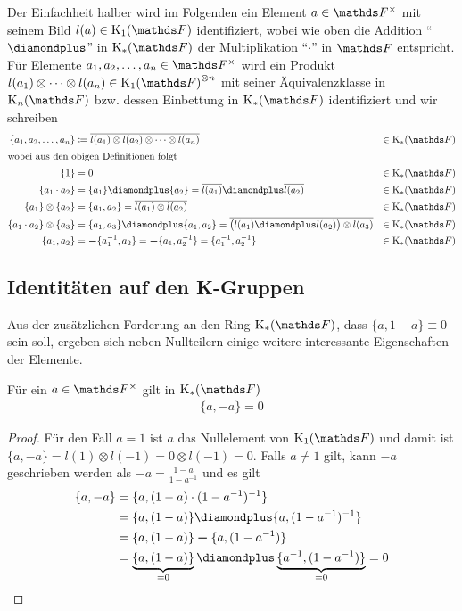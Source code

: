 \documentclass[ngerman,fontsize=11pt, paper=a4, parskip=half, titlepage=true, toc=bib]{scrartcl}
\begin{document}
\begin{Not}
  Der Einfachheit halber wird im Folgenden
  ein Element $a\in\Fx$ mit seinem Bild
  $l(a)\in\K_1(\F)$ identifiziert, wobei wie oben 
  die Addition \enquote{$\p$} in $\KF$
  der Multiplikation \enquote{$\cdot$} in $\F$ entspricht.
  Für Elemente $a_1,a_2,\dotsc,a_n\in\Fx$ wird
  ein Produkt $l(a_1)\otimes\dotsb \otimes l(a_n)\in{\KoF}^{\otimes n}$ 
  mit seiner Äquivalenzklasse in $\KnF$ 
  bzw. dessen Einbettung in $\KF$ identifiziert
  und wir schreiben
  \begin{align*}
    \{ a_1,a_2,\dotsc,a_n\}
    &\coloneqq \overline{l(a_1)\otimes l(a_2)\otimes \dotsb \otimes
      l(a_n)} 
    &\in\KF\\ 
    \intertext{wobei aus den obigen Definitionen folgt}
    \{1\}&=0 &\in\KF\\
    \{ a_1 \cdot a_2 \}
    &=  \{a_1\}\p \{a_2\} = \overline{l(a_1)} \p \overline{l(a_2)}  &\in\KF \\
    \{ a_1 \} \otimes \{ a_2 \}
    &= \{ a_1,a_2 \} = \overline{l(a_1)\otimes l(a_2)} &\in\KF \\
    \{ a_1\cdot a_2 \} \otimes \{ a_3 \}
    &= \{ a_1,a_3 \} \p \{a_1, a_2\} 
      = \overline{\big(l(a_1)\p l(a_2)\big) \otimes l(a_3)} &\in\KF\\
    \{ a_1, a_2\} 
    &= \m\{a_1^{-1},a_2\} = \m\{a_1,a_2^{-1}\} 
      = \{a_1^{-1},a_2^{-1}\} &\in\KF                               
  \end{align*}
\end{Not}

\subsection{Identitäten auf den K-Gruppen}
Aus der zusätzlichen Forderung an den Ring $\KF$, 
dass $\{a,1-a\}\equiv 0$ sein soll, ergeben sich neben Nullteilern 
einige weitere interessante Eigenschaften der Elemente.

\begin{Lem}\label{identitaetminus}
  Für ein $a \in\Fx$ gilt in $\KF$
  \begin{gather*}
    \{a,-a\}=0
  \end{gather*}
  \begin{proof}
    Für den Fall $a=1$ ist $a$ das Nullelement von $\KoF$ und damit ist 
    $\{a,-a\}=l(1)\otimes l(-1) = 0\otimes l(-1) = 0$.
    Falls $a\neq 1$ gilt, kann $-a$ geschrieben werden als
    $-a=\frac{1-a}{1-a^{-1}}$ und es gilt
    \begin{align*}
      \{a,-a\} &= \{a,(1-a)\cdot (1-a^{-1})^{-1}\}\\
               &= \{a,(1-a)\}\p\{a,(1-a^{-1})^{-1}\} \\
               &= \{a,(1-a)\}\m\{a,(1-a^{-1})\} \\
               &= \underbrace{\{a,(1-a)\}}_{=0}
                 \p\underbrace{\{a^{-1},(1-a^{-1})\}}_{=0} 
                 =0
    \end{align*}
  \end{proof}
\end{Lem}
\end{document}
